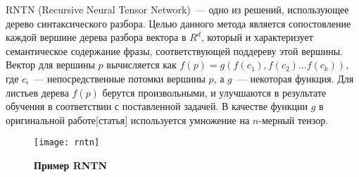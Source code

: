 RNTN (Recursive Neural Tensor Network)~--- одно из решений, использующее дерево синтаксического разбора. Целью данного метода является сопостовление каждой вершине дерева разбора вектора в $R^d$, который и характеризует семантическое содержание фразы, соответствующей поддереву этой вершины.
Вектор для вершины $p$ вычисляется как $f(p)=g(f(c_1), f(c_2) \dots{} f(c_k))$, где $c_i$~--- непосредственные потомки вершины $p$, а $g$~--- некоторая функция. Для листьев дерева $f(p)$ берутся произвольными, и улучшаются в результате обучения в соответствии с поставленной задачей.
В качестве функции $g$ в оригинальной работе[статья] используется умножение на $n$-мерный тензор.

\begin{figure}[h]
\texttt{[image: rntn]}
\caption{\textbf{Пример RNTN}}
\label{fig:rntn}
\end{figure}
 